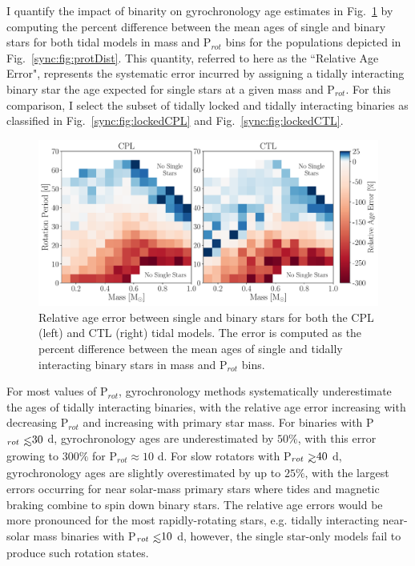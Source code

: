 I quantify the impact of binarity on gyrochronology age estimates in Fig.~\ref{sync:fig:gyro} by computing the percent difference between the mean ages of single and binary stars for both tidal models in mass and P$_{rot}$ bins for the populations depicted in Fig.~\ref{sync:fig:protDist}. This quantity, referred to here as the ``Relative Age Error", represents the systematic error incurred by assigning a tidally interacting binary star the age expected for single stars at a given mass and P$_{rot}$. For this comparison, I select the subset of tidally locked and tidally interacting binaries as classified in Fig.~\ref{sync:fig:lockedCPL} and Fig.~\ref{sync:fig:lockedCTL}. 

\begin{figure}
	\includegraphics[width=\columnwidth]{gyro.pdf}
   \caption{Relative age error between single and binary stars for both the CPL (left) and CTL (right) tidal models. The error is computed as the percent difference between the mean ages of single and tidally interacting binary stars in mass and P$_{rot}$ bins.}%
    \label{sync:fig:gyro}%
\end{figure}

For most values of P$_{rot}$, gyrochronology methods systematically underestimate the ages of tidally interacting binaries, with the relative age error increasing with decreasing P$_{rot}$ and increasing with primary star mass. For binaries with P$_{rot} \lsim 30$ d, gyrochronology ages are underestimated by $50\%$, with this error growing to $300\%$ for P$_{rot} \approx 10$ d. For slow rotators with P$_{rot} \gsim 40$ d, gyrochronology ages are slightly overestimated by up to $25\%$, with the largest errors occurring for near solar-mass primary stars where tides and magnetic braking combine to spin down binary stars.  The relative age errors would be more pronounced for the most rapidly-rotating stars, e.g. tidally interacting near-solar mass binaries with P$_{rot} \lsim 10$ d, however, the single star-only models fail to produce such rotation states.

